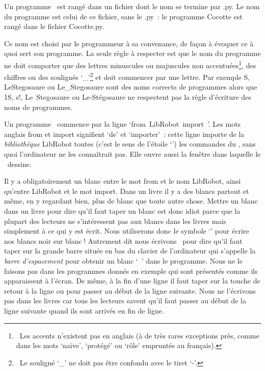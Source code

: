 Un programme \python\ est rangé dans un fichier dont le nom se termine par {\idt .py}.
Le nom du programme est celui de ce fichier, sans le {\idt .py}~: le programme 
{\idt Cocotte} est rangé dans le fichier {\idt Cocotte.py}.

Ce nom est choisi par le programmeur
à sa convenance, de façon à évoquer ce à quoi sert son programme.
 La seule règle à res\-pec\-ter est que le nom du programme
ne doit comporter que des lettres minuscules ou
majuscules non accentuées\footnote{\ Les accents n'existent pas en anglais
(à de très rares exceptions près, comme dans les mots `naïve', `protégé' ou
`rôle' empruntés au français).}, des chiffres ou
des soulignés `\_'\footnote{\ Le souligné `\_' ne doit pas être confondu avec le tiret `-'.}
et doit commencer par une lettre. Par exemple {\idt  S}, 
{\idt  LeStegosaure} ou {\idt  Le\_Stegosaure} sont des noms corrects de
programmes alors que {\idt  1S}, 
{\idt  s!}, {\idt  Le\ Stegosaure} ou {\idt  Le-Stégosaure} ne respectent
pas la règle d'écriture des noms de programmes. 

Un programme \python\ commence par la ligne `{\mcl from}\ {\idt LibRobot}\ {\mcl import}\ {\idt *}'.
Les mots anglais {\mcl from} et {\mcl import} signifient `de' et `importer'~: cette ligne 
importe de la 
{\em bibliothèque} {\idt LibRobot} toutes (c'est le sens de l'étoile `{\idt *}') 
les commandes du 
\robot, sans quoi l'ordinateur ne les connaîtrait pas. Elle ouvre aussi la fenêtre 
dans laquelle le \robot\ dessine.

Il y a obligatoirement un blanc
entre le mot {\mcl from} et le nom {\idt LibRobot}, ainsi qu'entre {\idt LibRobot} et le 
mot {\mcl import}. Dans un livre il y a des blancs partout et même, en y regardant bien,
plus de blanc que toute autre chose. Mettre un blanc dans un livre pour dire qu'il faut taper
un blanc est donc idiot parce que la plupart des lecteurs ne s'intéressent pas aux 
blancs dans les livres mais simplement à ce qui y est écrit.
Nous utiliserons donc le symbole `\blanc' pour écrire nos blancs noir sur \hbox{blanc$\:$!}
Autrement dit nous écrivons \blanc\ pour dire qu'il faut taper sur la grande barre 
située en bas du clavier de l'or\-di\-na\-teur qui s'appelle la 
{\em barre d'espacement}
pour obtenir un blanc `\ ' dans le programme. 
Nous ne le faisons pas dans les programmes donnés en exemple qui sont
présentés comme ils apparaissent à l'écran. De même, à la fin d'une 
ligne il faut taper sur la touche de retour à la ligne 
\framebox[11.mm][l]{$\hookleftarrow$~~~}\hspace{0.3ex} ou \hspace{0.3ex}\hspace{0.3ex} pour passer au début de la
ligne suivante. Nous ne l'écrivons pas dans les livres car tous les lecteurs savent
qu'il faut passer au début de la ligne suivante quand ils sont arrivés en fin de ligne. 

